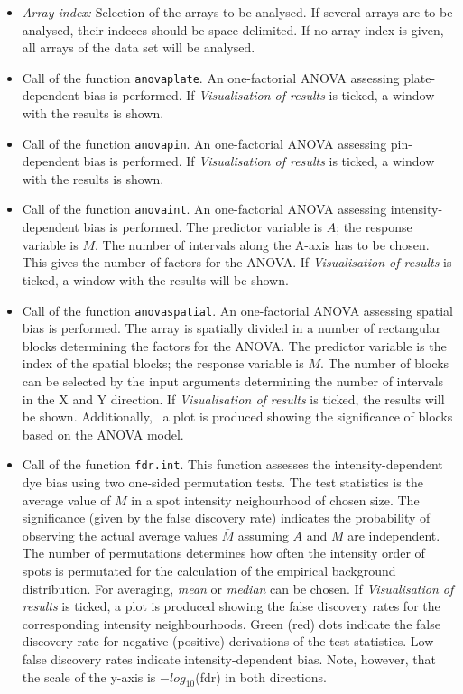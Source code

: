 \documentclass[a4paper,11pt]{article}
\begin{document}
\begin{itemize}
\item \textit{Array index:} Selection of the arrays to be analysed. If several arrays are to
be analysed, their indeces should be space delimited. If no array index is given, all
arrays of the data set will be  analysed. 

\item {}  Call of the function \texttt{anovaplate}. An one-factorial ANOVA assessing plate-dependent bias is performed. If \textit{Visualisation of results} is ticked, a window
with the results is shown. 


\item {} Call of the function \texttt{anovapin}. An one-factorial ANOVA assessing pin-dependent bias is performed. If \textit{Visualisation of results} is ticked, a window
with the results is shown. 

\item {}  Call of the function \texttt{anovaint}. An one-factorial ANOVA assessing intensity-dependent bias is performed. The predictor variable is $A$; the response variable is $M$.  The number of intervals along the A-axis
has to be chosen. This gives the number of factors for the ANOVA.  
If \textit{Visualisation of results} is ticked, a window with the results will be shown. 

\item {}  Call of the function \texttt{anovaspatial}. An  one-factorial 
ANOVA assessing spatial bias is performed. The array is spatially divided in a number of rectangular blocks
determining the factors for the ANOVA. The predictor variable is the index of the spatial blocks; the response variable is $M$. The number of blocks can be selected  by the input arguments determining the number
of intervals in the X and Y direction.   If \textit{Visualisation of results} is ticked, 
the  results will be shown. Additionally, \
 a plot is produced showing the significance of blocks based on the ANOVA model. 

\item {}  Call of the function \texttt{fdr.int}. This function assesses
 the intensity-dependent dye bias using two one-sided permutation tests. The test statistics is the average value 
of  $M$  in a spot intensity neighourhood of chosen size. The significance (given by the false discovery
rate) indicates the probability of observing the actual average values  $\bar{M}$ 
assuming $A$ and $M$ are independent. 
 The number of permutations determines how often
the  intensity order of spots  is permutated for the calculation of the
 empirical background distribution.
For averaging, \textit{mean} or \textit{median} can be chosen.
 If \textit{Visualisation of results} is ticked,  a plot is produced showing the false discovery rates for the corresponding
 intensity neighbourhoods. Green (red)  dots indicate the false discovery rate 
for  negative (positive) derivations of the test statistics.
 Low false discovery rates indicate
intensity-dependent bias.  Note, however, that the scale of the y-axis  is $-log_{10}$(fdr) in both directions.
 


\end{itemize}
\end{document}
